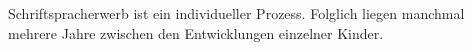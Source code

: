 Schriftspracherwerb ist ein individueller Prozess.
Folglich liegen manchmal mehrere Jahre zwischen den Entwicklungen einzelner Kinder.